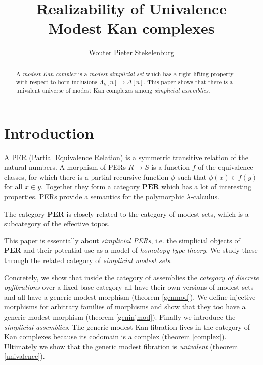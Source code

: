\documentclass{amsart}
\title{Realizability of Univalence\\
Modest Kan complexes}
\author[W. P. Stekelenburg]{Wouter Pieter Stekelenburg}
\theoremstyle{plain}
\theoremstyle{definition}
\newcommand\hide[1]{}
\begin{document}
\begin{abstract}
A \emph{modest Kan complex} is a \emph{modest simplicial set} which has a right lifting property with respect to horn inclusions $\Lambda_k[n] \to \Delta[n]$. This paper shows that there is a univalent universe of modest Kan complexes among \emph{simplicial assemblies}.
\end{abstract}

\maketitle

\newcommand\pers{\mathbf{PER}}
\section{Introduction}
A PER (Partial Equivalence Relation) is a symmetric transitive relation of the natural numbers. A morphism of PERs $R\to S$ is a function $f$ of the equivalence classes, for which there is a partial recursive function $\phi$ such that $\phi(x)\in f(y)$ for all $x\in y$. Together they form a category $\pers$ which has a lot of interesting properties. PERs provide a semantics for the polymorphic $\lambda$-calculus. \cite{MR1099188,MR2074932,MR1003196}%

The category $\pers$ is closely related to the category of modest sets, which is a subcategory of the effective topos. \cite{MR1097022,MR1023803,MR2479466}

This paper is essentially about \emph{simplicial PERs}, i.e. the simplicial objects of $\pers$ and their potential use as a model of \emph{homotopy type theory}. We study these through the related category of \emph{simplicial modest sets}. 

Concretely, we show that inside the category of assemblies the \emph{category of discrete opfibrations} over a fixed base category all have their own versions of modest sets and all have a generic modest morphism (theorem \ref{genmod}). We define injective morphisms for arbitrary families of morphisms and show that they too have a generic modest morphism (theorem \ref{geninjmod}). Finally we introduce the \emph{simplicial assemblies}. \hide{and show that the Kan complexes form a \emph{category of fibrant objects} (theorem \ref{Hmtp}).} The generic modest Kan fibration lives in the category of Kan complexes because its codomain is a complex (theorem \ref{complex}). Ultimately we show that the generic modest fibration is \emph{univalent} (theorem \ref{univalence}).
\end{document}
